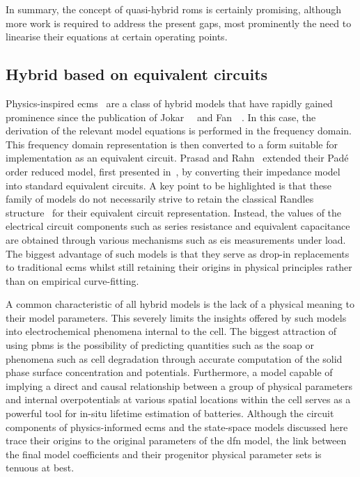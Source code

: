In summary, the  concept of quasi-hybrid \glspl{rom} is  certainly promising, although
more work is required to address the  present gaps, most prominently the need to
linearise their equations at certain operating points.


\subsection{Hybrid  based on equivalent circuits}\label{subsec:hybridroms}

Physics-inspired
\glspl{ecm}~\cite{Prasad2012,Prasad2014,Zhang2017,Cheng2017,Merla2018}
are a class of hybrid models that have rapidly gained prominence since the
publication of Jokar~\etal~\cite{Jokar2016} and Fan~\etal~\cite{Fan2015}. In
this case, the derivation of the relevant model equations is performed in
the frequency domain. This frequency domain representation is then converted
to a form suitable for implementation as an equivalent circuit. Prasad
and Rahn~\cite{Prasad2014} extended their Padé order reduced model, first
presented in~\cite{Prasad2013}, by converting their impedance model into
standard equivalent circuits. A key point to be highlighted is that these
family of models do not necessarily strive to retain the classical Randles
structure~\cite{Randles1947} for their equivalent circuit representation.
Instead, the values of the electrical circuit components such as series
resistance and equivalent capacitance are obtained through various mechanisms
such as \gls{eis} measurements under load. The biggest advantage of such
models is that they serve as drop-in replacements to traditional \glspl{ecm}
whilst still retaining their origins in physical principles rather than on
empirical curve-fitting.


A  common  characteristic  of all  hybrid  models  is  the  lack of  a  physical
meaning to  their model  parameters. This severely  limits the  insights offered
by  such  models  into  electrochemical  phenomena internal  to  the  cell.  The
biggest  attraction  of  using  \glspl{pbm} is  the  possibility  of  predicting
quantities such as the \gls{soap} or  phenomena such as cell degradation through
accurate computation  of the solid  phase surface concentration  and potentials.
Furthermore,  a model  capable  of  implying a  direct  and causal  relationship
between a  group of physical  parameters and internal overpotentials  at various
spatial locations within the cell serves as a powerful tool for in-situ lifetime
estimation  of batteries.  Although the  circuit components  of physics-informed
\glspl{ecm} and the state-space models discussed here trace their origins to the
original parameters  of the \gls{dfn}  model, the  link between the  final model
coefficients and their progenitor physical parameter sets is tenuous at best.


